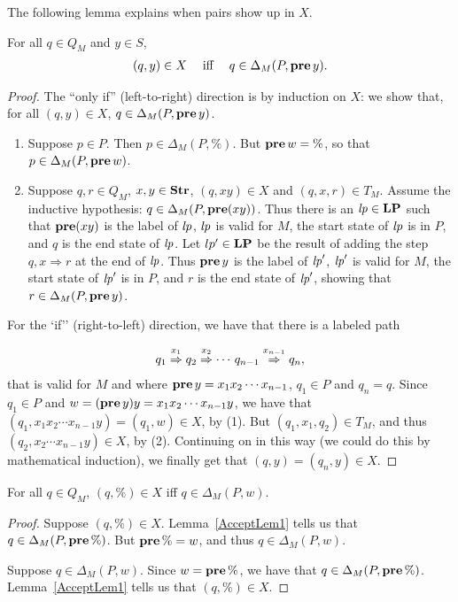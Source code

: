 The following lemma explains when pairs show up in $X$.

\begin{lemma}
\label{AcceptLem1}
For all $q\in Q_M$ and $y\in S$,
\begin{gather*}
(q,y)\in X\quad\;\allowbreak\mbox{iff}\allowbreak\;\quad q\in\Delta_M(P,\mathbf{pre}\,y) .
\end{gather*}
\end{lemma}

\begin{proof}
The ``only if'' (left-to-right) direction is by induction on $X$:
we show that, for all $(q,y)\in X$, $q\in\Delta_M(P,\mathbf{pre}\,y)$.
\begin{enumerate}[(1)]
\item Suppose $p\in P$.  Then $p\in\Delta_M(P,\%)$.  But
$\mathbf{pre}\,w=\%$, so that $p\in\Delta_M(P,\mathbf{pre}\,w)$.

\item Suppose $q,r\in Q_M$, $x,y\in\mathbf{Str}$, $(q,xy)\in X$ and
$(q,x,r)\in T_M$.  Assume the inductive hypothesis:
$q\in\Delta_M(P,\mathbf{pre}(xy))$.
Thus there is an ${\it lp}\in\mathbf{LP}$
such that $\mathbf{pre}(xy)$ is the label of ${\it lp}$, ${\it lp}$ is valid for $M$,
the start state of ${\it lp}$ is in $P$, and $q$ is the end state of ${\it lp}$.
Let $lp'\in\mathbf{LP}$ be the result of adding the step $q,x\Rightarrow r$ at
the end of ${\it lp}$.  Thus $\mathbf{pre}\,y$ is the label of ${\it lp}'$, ${\it lp}'$ is
valid for $M$, the start state of ${\it lp}'$ is in $P$, and $r$ is the end
state of ${\it lp}'$, showing that $r\in\Delta_M(P,\mathbf{pre}\,y)$.
\end{enumerate}

For the `if'' (right-to-left) direction, we have that there is a
labeled path
\begin{gather*}
q_1\stackrel{\strut x_1}{\Rightarrow}q_2\stackrel{\strut x_2}{\Rightarrow}\cdots\,q_{n-1}\stackrel{\strut x_{n-1}}{\Rightarrow}q_n ,
\end{gather*}
that is valid for $M$ and where $\mathbf{pre}\,y=x_1x_2\cdots x_{n-1}$,
$q_1\in P$ and $q_n=q$.  Since $q_1\in P$ and
$w=(\mathbf{pre}\,y)y=x_1x_2\cdots x_{n-1}y$, we have that
$(q_1, x_1x_2\cdots x_{n-1}y)=(q_1,w)\in X$, by (1).  But
$(q_1,x_1,q_2)\in T_M$, and thus $(q_2, x_2\cdots x_{n-1}y)\in X$,
by (2). Continuing on in this way (we could do this by mathematical
induction), we finally get that $(q,y)=(q_n,y)\in X$.
\end{proof}

\begin{lemma}
\label{AcceptLem2}
For all $q\in Q_M$, $(q,\%)\in X$ iff $q\in\Delta_M(P,w)$.
\end{lemma}

\begin{proof}
Suppose $(q,\%)\in X$.  Lemma~\ref{AcceptLem1} tells us that
$q\in\Delta_M(P,\mathbf{pre}\,\%)$.  But $\mathbf{pre}\,\%=w$, and thus
$q\in\Delta_M(P,w)$.

Suppose $q\in\Delta_M(P,w)$.  Since $w=\mathbf{pre}\,\%$, we have that
$q\in\Delta_M(P,\mathbf{pre}\,\%)$.  Lemma~\ref{AcceptLem1} tells us that
$(q,\%)\in X$.
\end{proof}

